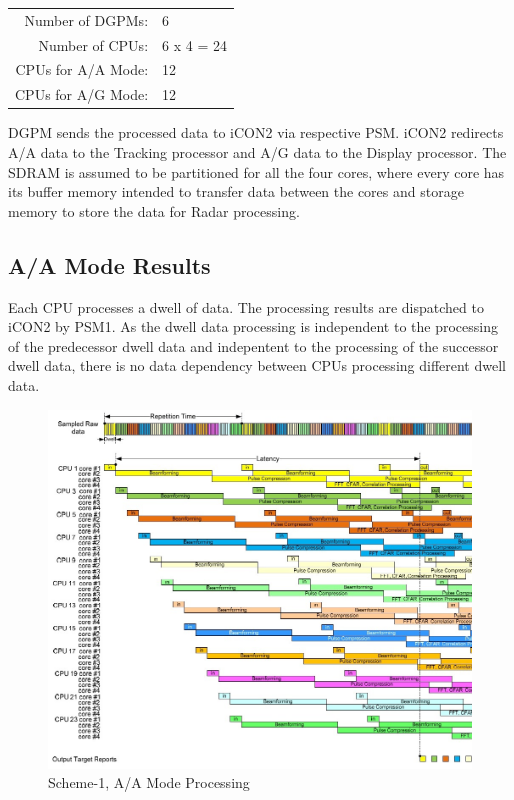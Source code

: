 \begin{tabular}{rl}
	Number of DGPMs: & 6 \\
	Number of CPUs: & 6 x 4 = 24 \\
	CPUs for A/A Mode: & 12 \\
	CPUs for A/G Mode: & 12 \\
\end{tabular}

\noindent
DGPM sends the processed data to iCON2 via respective PSM. iCON2 redirects A/A data to the Tracking processor and A/G data to the Display processor. The SDRAM is assumed to be partitioned for all the four cores, where every core has its buffer memory intended to transfer data between the cores and storage memory to store the data for Radar processing.

\subsection{A/A Mode Results}
\label{ss:scheme1:aa}
Each CPU processes a dwell of data. The processing results are dispatched to iCON2 by PSM1. As the dwell data processing is independent to the processing of the predecessor dwell data and indepentent to the processing of the successor dwell data, there  is no data dependency between CPUs processing different dwell data.

\begin{figure}[h!]
	\centering
	\includegraphics[width=140mm]{figures/aa_scheme1}
	\caption{Scheme-1, A/A Mode Processing}
	\label{fig:existing_analysis:aa_scheme1}
\end{figure}

